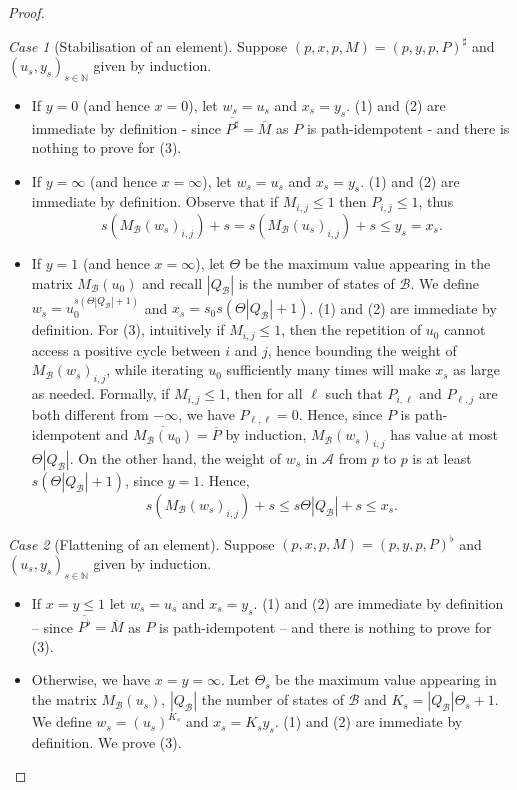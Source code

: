 \documentclass{lmcs}
\theoremstyle{remark}
\newtheorem{case}{Case}
\newcommand{\N}{\mathbb{N}}
\newcommand{\autA}{\mathcal{A}}
\newcommand{\autB}{\mathcal{B}}
\theoremstyle{remark}
\begin{document}
\begin{proof}
\begin{case}[Stabilisation of an element]
Suppose $(p,x,p,M) = (p,y,p,P)^\sharp$ and $(u_s,y_s)_{s\in\N}$ given by induction. 
\begin{itemize}
\item If $y = 0$ (and hence $x=0$), let $w_s = u_s$ and $x_s=y_s$. (1) and (2) are immediate by definition - since $\overline{P^\sharp} = \overline{M}$ as $P$ is path-idempotent - and there is nothing to prove for (3). 
\item If $y=\infty$ (and hence $x=\infty$), let $w_s = u_s$ and $x_s=y_s$. (1) and (2) are immediate by definition. Observe that if $M_{i,j} \le 1$ then $P_{i,j} \le 1$, thus 
\[
s(M_\autB(w_s)_{i,j}) + s = s(M_\autB(u_s)_{i,j}) + s \le y_s = x_s.
\]
\item If $y=1$ (and hence $x=\infty$), let $\Theta$ be the maximum value appearing in the matrix $M_\autB(u_0)$ and recall $|Q_\autB|$ is the number of states of $\autB$.
We define $w_s = u_0^{s(\Theta|Q_\autB| + 1)}$ and $x_s = s_0s(\Theta|Q_\autB| + 1)$. (1) and (2) are immediate by definition. For (3), intuitively if $M_{i,j} \leq 1$, then the repetition of $u_0$ cannot access a positive cycle between $i$ and $j$, hence bounding the weight of $M_\autB(w_s)_{i,j}$, while iterating $u_0$ sufficiently many times will make $x_s$ as large as needed. 
Formally, if $M_{i,j} \leq 1$, then for all $\ell$ such that $P_{i,\ell}$ and $P_{\ell,j}$ are both different from $-\infty$, we have $P_{\ell,\ell} = 0$. Hence, since $P$ is path-idempotent and $\overline{M_\autB(u_0)} = \overline{P}$ by induction, $M_\autB(w_s)_{i,j}$ has value at most $\Theta|Q_\autB|$. On the other hand, the weight of $w_s$ in $\autA$ from $p$ to $p$ is at least $s(\Theta|Q_\autB| + 1)$, since $y=1$. Hence,
\[
s(M_\autB(w_s)_{i,j}) + s \le s\Theta|Q_\autB| + s \le x_s.
\]

\end{itemize}
\end{case}
\begin{case}[Flattening of an element]

Suppose $(p,x,p,M) = (p,y,p,P)^\flat$ and $(u_s,y_s)_{s\in\N}$ given by induction. 
\begin{itemize}
\item If $x=y\le 1$ let $w_s = u_s$ and $x_s=y_s$. (1) and (2) are immediate by definition -- since $\overline{P^\flat} = \overline{M}$ as $P$ is path-idempotent -- and there is nothing to prove for (3). 

\item Otherwise, we have $x= y=\infty$. 
Let $\Theta_s$ be the maximum value appearing in the matrix $M_\autB(u_s)$, $|Q_\autB|$ the number of states of $\autB$ and $K_s = |Q_\autB|\Theta_s + 1$. We define $w_s = (u_s)^{K_s}$ and $x_s = K_s y_s$.
(1) and (2) are immediate by definition. We prove (3).


\end{itemize}
\end{case}
\end{proof}
\end{document}
